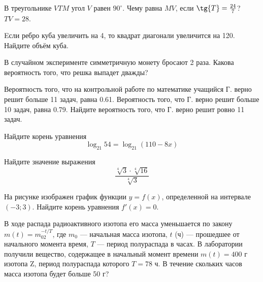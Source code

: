 \cleardoublepage
\def\examvart{Вариант 14.3}
\normalsize

\startpartone
\large




\begin{taskBN}{1}
В треугольнике $VTM$ угол $V$ равен $90^\circ$. Чему равна  $MV$, если $\tg{T}=\frac{24}{7}$?  $TV=28$. 
\end{taskBN}

\begin{taskBN}{2}
Eсли ребро куба увеличить на 4, то квадрат диагонали увеличится на 120. Найдите объём куба.
\end{taskBN}

\begin{taskBN}{3}
В случайном эксперименте симметричную монету бросают 2 раза. Какова вероятность того, что решка выпадет дважды?
\end{taskBN}

\begin{taskBN}{4}
Вероятность того, что на контрольной работе по математике учащийся Г. верно решит больше 11 задач, равна 0.61. Вероятность того, что Г. верно решит больше 10 задач, равна 0.79. Найдите вероятность того, что Г. верно решит ровно 11 задач.
\end{taskBN}

\begin{taskBN}{5}
Найдите корень уравнения $$\log_{21}54=\log_{21}(110-8x)$$
\end{taskBN}

\begin{taskBN}{6}
Найдите значение выражения $$\frac{\sqrt [4]{3}\cdot \sqrt [4]{16}}{\sqrt [4]{3}}$$
\end{taskBN}

\begin{taskBN}{7}
На рисунке изображен график функции $y = f(x)$, определенной на интервале $(-3; 3)$. Найдите корень уравнения $f'(x)=0$.
\end{taskBN}

\begin{taskBN}{8}
В ходе распада радиоактивного изотопа его масса уменьшается по закону $m(t) = m_02^{-t/T}$, где $m_0$ — начальная масса изотопа, $t$ (ч) — прошедшее от начального момента время, $T$ — период полураспада в часах. В лаборатории получили вещество, содержащее в начальный момент времени $m (t) = 400$ г изотопа Z, период полураспада которого $T = 78$ ч. В течение скольких часов масса изотопа будет больше 50 г?
\end{taskBN}


